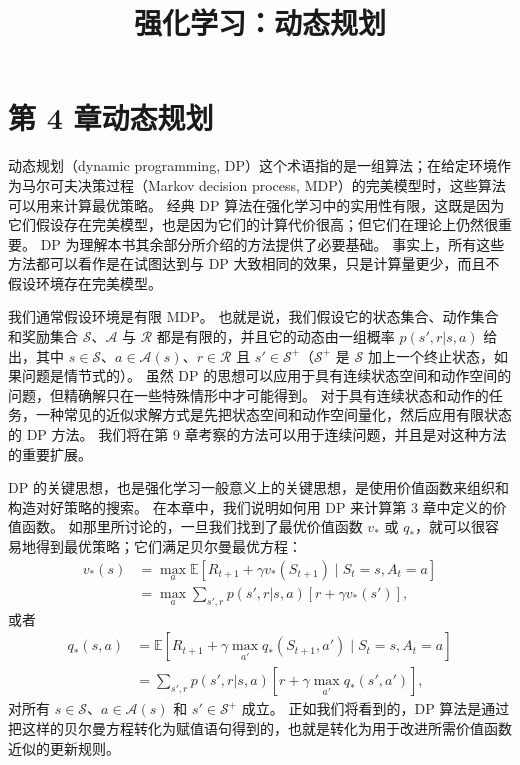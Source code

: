 \documentclass[UTF8, 12pt, fontset=fandol, oneside]{ctexart}
\title{强化学习：动态规划}
\author{}
\date{}
\begin{document}
\maketitle

\section*{第 4 章\quad 动态规划}

动态规划（dynamic programming, DP）这个术语指的是一组算法；在给定环境作为马尔可夫决策过程（Markov decision process, MDP）的完美模型时，这些算法可以用来计算最优策略。
经典 DP 算法在强化学习中的实用性有限，这既是因为它们假设存在完美模型，也是因为它们的计算代价很高；但它们在理论上仍然很重要。
DP 为理解本书其余部分所介绍的方法提供了必要基础。
事实上，所有这些方法都可以看作是在试图达到与 DP 大致相同的效果，只是计算量更少，而且不假设环境存在完美模型。

我们通常假设环境是有限 MDP。
也就是说，我们假设它的状态集合、动作集合和奖励集合 $\mathcal{S}$、$\mathcal{A}$ 与 $\mathcal{R}$ 都是有限的，并且它的动态由一组概率 $p(s',r|s,a)$ 给出，其中 $s\in\mathcal{S}$、$a\in\mathcal{A}(s)$、$r\in\mathcal{R}$ 且 $s'\in\mathcal{S}^+$（$\mathcal{S}^+$ 是 $\mathcal{S}$ 加上一个终止状态，如果问题是情节式的）。
虽然 DP 的思想可以应用于具有连续状态空间和动作空间的问题，但精确解只在一些特殊情形中才可能得到。
对于具有连续状态和动作的任务，一种常见的近似求解方式是先把状态空间和动作空间量化，然后应用有限状态的 DP 方法。
我们将在第 9 章考察的方法可以用于连续问题，并且是对这种方法的重要扩展。

DP 的关键思想，也是强化学习一般意义上的关键思想，是使用价值函数来组织和构造对好策略的搜索。
在本章中，我们说明如何用 DP 来计算第 3 章中定义的价值函数。
如那里所讨论的，一旦我们找到了最优价值函数 $v_*$ 或 $q_*$，就可以很容易地得到最优策略；它们满足贝尔曼最优方程：
\begin{equation}
\begin{aligned}
v_*(s)
&= \max_a \mathbb{E}\!\left[R_{t+1}+\gamma v_*(S_{t+1}) \mid S_t=s,A_t=a\right] \\
&= \max_a \sum_{s',r} p(s',r|s,a)\left[r+\gamma v_*(s')\right],
\end{aligned}
\tag{4.1}
\end{equation}
或者
\begin{equation}
\begin{aligned}
q_*(s,a)
&= \mathbb{E}\!\left[R_{t+1}+\gamma\max_{a'}q_*(S_{t+1},a') \mid S_t=s,A_t=a\right] \\
&= \sum_{s',r} p(s',r|s,a)\left[r+\gamma\max_{a'}q_*(s',a')\right],
\end{aligned}
\tag{4.2}
\end{equation}
对所有 $s\in\mathcal{S}$、$a\in\mathcal{A}(s)$ 和 $s'\in\mathcal{S}^+$ 成立。
正如我们将看到的，DP 算法是通过把这样的贝尔曼方程转化为赋值语句得到的，也就是转化为用于改进所需价值函数近似的更新规则。
\end{document}
